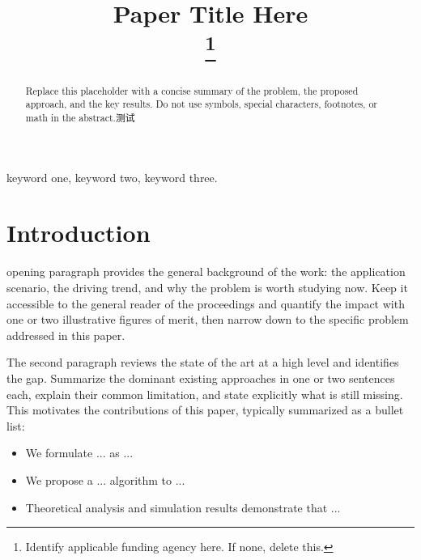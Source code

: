 \documentclass[conference]{IEEEtran}
\begin{document}
\title{Paper Title Here\\
\thanks{Identify applicable funding agency here. If none, delete this.}
}

\author{
\and
{}
}

\maketitle

\begin{abstract}
Replace this placeholder with a concise summary of the problem, the proposed
approach, and the key results. Do not use symbols, special characters,
footnotes, or math in the abstract.测试
\end{abstract}

\begin{IEEEkeywords}
keyword one, keyword two, keyword three.
\end{IEEEkeywords}

\section{Introduction}
 opening paragraph provides the general background of
the work: the application scenario, the driving trend, and why the problem
is worth studying now. Keep it accessible to the general reader of the
proceedings and quantify the impact with one or two illustrative figures
of merit, then narrow down to the specific problem addressed in this
paper.

The second paragraph reviews the state of the art at a high level and
identifies the gap. Summarize the dominant existing approaches in one or
two sentences each, explain their common limitation, and state explicitly
what is still missing. This motivates the contributions of this paper,
typically summarized as a bullet list:
\begin{itemize}
\item We formulate ... as ...
\item We propose a ... algorithm to ...
\item Theoretical analysis and simulation results demonstrate that ...
\end{itemize}
\end{document}

